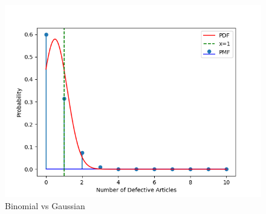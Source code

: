 \documentclass[journal,12pt,onecolumn]{IEEEtran}
\begin{document}
\begin{figure}[H]
\centering
\includegraphics[width=\columnwidth]{./figs/figure1.png}
\caption{Binomial vs Gaussian}
\label{fig:BvG_py}
\end{figure}
\end{document}
